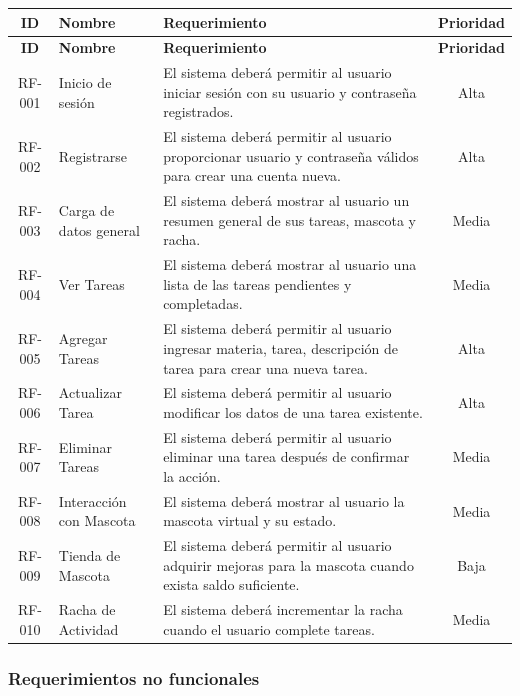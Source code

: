 \documentclass[12pt,letterpaper]{article}
\begin{document}
\begin{xltabular}{\linewidth}{| c | >{\raggedright\arraybackslash}p{3.5cm} | X | c |}
    \hline
    \textbf{ID} & \textbf{Nombre} & \textbf{Requerimiento} & \textbf{Prioridad} \\ \hline
\endfirsthead
    \hline
    \textbf{ID} & \textbf{Nombre} & \textbf{Requerimiento} & \textbf{Prioridad} \\ \hline
\endhead
    RF-001 & Inicio de sesión & El sistema deberá permitir al usuario iniciar sesión con su usuario y contraseña registrados. & Alta \\ \hline
    RF-002 & Registrarse & El sistema deberá permitir al usuario proporcionar usuario y contraseña válidos para crear una cuenta nueva. & Alta \\ \hline
    RF-003 & Carga de datos general & El sistema deberá mostrar al usuario un resumen general de sus tareas, mascota y racha. & Media \\ \hline
    RF-004 & Ver Tareas & El sistema deberá mostrar al usuario una lista de las tareas pendientes y completadas. & Media \\ \hline
    RF-005 & Agregar Tareas & El sistema deberá permitir al usuario ingresar materia, tarea, descripción de tarea para crear una nueva tarea. & Alta \\ \hline
    RF-006 & Actualizar Tarea & El sistema deberá permitir al usuario modificar los datos de una tarea existente. & Alta \\ \hline
    RF-007 & Eliminar Tareas & El sistema deberá permitir al usuario eliminar una tarea después de confirmar la acción. & Media \\ \hline
    RF-008 & Interacción con Mascota & El sistema deberá mostrar al usuario la mascota virtual y su estado. & Media \\ \hline
    RF-009 & Tienda de Mascota & El sistema deberá permitir al usuario adquirir mejoras para la mascota cuando exista saldo suficiente. & Baja \\ \hline
    RF-010 & Racha de Actividad & El sistema deberá incrementar la racha cuando el usuario complete tareas. & Media \\ \hline
    
\end{xltabular}

\newpage
\subsubsection{Requerimientos no funcionales}
\end{document}

